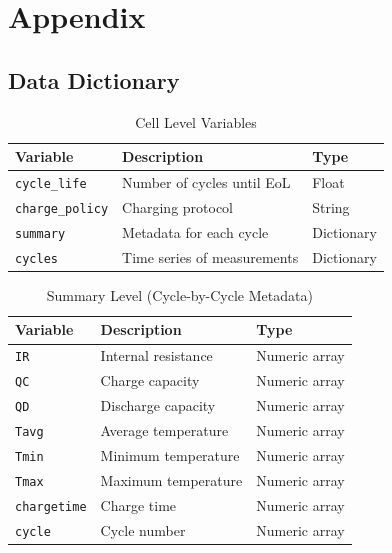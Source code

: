 \section*{Appendix}


\subsection*{Data Dictionary}

\begin{table}[H]
\centering
\caption{Cell Level Variables}
\label{tab:cell_level}
\begin{tabular}{lll}
\toprule
Variable & Description & Type \\
\midrule
\texttt{cycle\_life} & Number of cycles until EoL & Float \\
\texttt{charge\_policy} & Charging protocol & String \\
\texttt{summary} & Metadata for each cycle & Dictionary \\
\texttt{cycles} & Time series of measurements & Dictionary \\
\bottomrule
\end{tabular}
\end{table}

\begin{table}[H]
\centering
\caption{Summary Level (Cycle-by-Cycle Metadata)}
\label{tab:summary_level}
\begin{tabular}{lll}
\toprule
Variable & Description & Type \\
\midrule
\texttt{IR} & Internal resistance & Numeric array \\
\texttt{QC} & Charge capacity & Numeric array \\
\texttt{QD} & Discharge capacity & Numeric array \\
\texttt{Tavg} & Average temperature & Numeric array \\
\texttt{Tmin} & Minimum temperature & Numeric array \\
\texttt{Tmax} & Maximum temperature & Numeric array \\
\texttt{chargetime} & Charge time & Numeric array \\
\texttt{cycle} & Cycle number & Numeric array \\
\bottomrule
\end{tabular}
\end{table}

